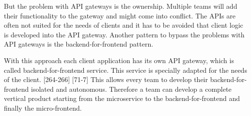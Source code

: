 \bigskip

\noindent But the problem with API gateways is the ownership. Multiple teams will add their functionality to the gateway and might come into conflict. The APIs are often not suited for the needs of clients and it has to be avoided that client logic is developed into the API gateway. Another pattern to bypass the problems with API gateways is the backend-for-frontend pattern. \cite[265-266]{book:2018:richardson:background:bff:microservices-patterns}

\bigskip

\noindent With this approach each client application has its own API gateway, which is called backend-for-frontend service. This service is specially adapted for the needs of the client. \cite{book:2018:richardson:background:bff:microservices-patterns}[264-266] \cite{book:2021:newman:background:bff:micro-services}[71-7] This allows every team to develop their backend-for-frontend isolated and autonomous. Therefore a team can develop a complete vertical product starting from the microservice to the backend-for-frontend and finally the micro-frontend. \cite{book:2020:geers:background:micro-frontends:micro-frontends-in-action}
